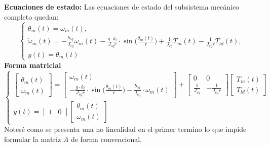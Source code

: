 \documentclass[12pt, a4paper,journal, onecolumn, compsoc]{IEEEtran}
\begin{document}
    \textbf{Ecuaciones de estado:} Las ecuaciones de estado del subsistema mecánico completo quedan:
    \begin{equation}
        \begin{cases}
            \dot \theta_m(t) = \omega_m(t), \\ 
            \dot\omega_m(t)=-\frac{b_{eq}}{J_{eq}}\omega_m(t)-\frac{g\cdot k_l}{J_{eq}r}\cdot \sin{\Big(\frac{\theta_m(t)}{r}\Big)}+\frac{1}{J_{eq}}T_m(t)-\frac{1}{J_{eq}r}T_{ld}(t),\\
            y(t)=\theta_m(t)
        \end{cases}
        \label{eq: EqEstadoModeloMecanico}
    \end{equation}
    \textbf{Forma matricial}
    \begin{equation}
        \begin{cases}
            \begin{bmatrix}
                \dot\theta_m(t) \\\dot\omega_m(t)
            \end{bmatrix}
            = 
            \begin{bmatrix}
                \omega_m(t)\\
                -\frac{g\cdot k_l}{J_{eq}r}\cdot\sin{\big(\frac{\theta_m(t)}{r}\big)}-\frac{b_{eq}}{J_{eq}}\cdot\omega_m(t)
            \end{bmatrix}
            +
            \begin{bmatrix}
                0 & 0\\
                \frac{1}{J_{eq}} &-\frac{1}{J_{eq}r}
            \end{bmatrix}
            \begin{bmatrix}
                T_m(t)\\
                T_{ld}(t)
            \end{bmatrix}\\
            y(t) = \begin{bmatrix}
                1 & 0
            \end{bmatrix}
            \begin{bmatrix}
                \theta_m(t)\\
                \omega_m(t)
            \end{bmatrix}
        \end{cases}
    \end{equation}
    Notesé como se presenta una no linealidad en el primer termino lo que impide formular la matriz $A$ de forma convencional.
\end{document}

